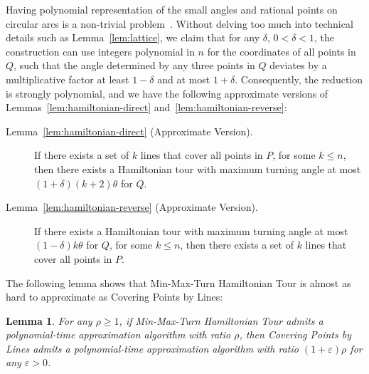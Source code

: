 \documentclass[letterpaper,11pt]{article}
\newtheorem{lemma}{Lemma}
\newcommand{\eps}{\varepsilon}
\begin{document}
Having polynomial representation of the small angles and rational points
on circular arcs is a non-trivial problem~\cite{CDR92,Bu98}.
Without delving too much into technical details such as Lemma~\ref{lem:lattice},
we claim that for any $\delta$, $0 < \delta < 1$,
the construction can use integers polynomial in $n$
for the coordinates of all points in $Q$,
such that the angle determined by any three points in $Q$ deviates by
a multiplicative factor at least $1-\delta$ and at most $1+\delta$.
Consequently,
the reduction is strongly polynomial,
and we have the following approximate versions of
Lemmas~\ref{lem:hamiltonian-direct} and~\ref{lem:hamiltonian-reverse}:
\begin{description}

\item[Lemma~\ref{lem:hamiltonian-direct} (Approximate Version).]
If there exists a set of $k$ lines that cover all points in $P$,
for some $k \leq n$,
then there exists a Hamiltonian tour with maximum turning angle at most
$(1+\delta)(k+2)\theta$ for $Q$.

\item[Lemma~\ref{lem:hamiltonian-reverse} (Approximate Version).]
If there exists a Hamiltonian tour with maximum turning angle at most
$(1-\delta)k\theta$ for $Q$, for some $k \leq n$,
then there exists a set of $k$ lines that cover all points in $P$.

\end{description}

The following lemma shows that {\sc Min-Max-Turn Hamiltonian Tour}
is almost as hard to approximate as {\sc Covering Points by Lines}:

\begin{lemma}\label{lem:hamiltonian}
For any $\rho \ge 1$,
if {\sc Min-Max-Turn Hamiltonian Tour}
admits a polynomial-time approximation algorithm with ratio $\rho$,
then {\sc Covering Points by Lines} admits a polynomial-time
approximation algorithm with ratio $(1 + \eps)\rho$ for any $\eps > 0$.
\end{lemma}
\end{document}
